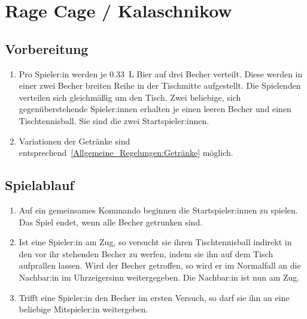\chapter{Rage Cage / Kalaschnikow}
\section{Vorbereitung}
\begin{enumerate}[label={(\arabic*)}]
    \item
    Pro Spieler:in werden je \SI{0,33}{\liter} Bier auf drei Becher verteilt.
    Diese werden in einer zwei Becher breiten Reihe in der Tischmitte aufgestellt.
    Die Spielenden verteilen sich gleichmäßig um den Tisch.
    Zwei beliebige, sich gegenüberstehende Spieler:innen erhalten je einen leeren Becher und einen Tischtennisball.
    Sie sind die zwei Startspieler:innen.

    \item
    Variationen der Getränke sind entsprechend~\ref{Allgemeine_Regelungen:Getränke} möglich.
\end{enumerate}

\section{Spielablauf}
\begin{enumerate}[label={(\arabic*)}]
    \item
    Auf ein gemeinsames Kommando beginnen die Startspieler:innen zu spielen.
    Das Spiel endet, wenn alle Becher getrunken sind.

    \item
    Ist eine Spieler:in am Zug, so versucht sie ihren Tischtennisball indirekt in den vor ihr stehenden Becher zu werfen, indem sie ihn auf dem Tisch aufprallen lassen.
    Wird der Becher getroffen, so wird er im Normalfall an die Nachbar:in im Uhrzeigersinn weitergegeben.
    Die Nachbar:in ist nun am Zug.

    \item
    Trifft eine Spieler:in den Becher im ersten Versuch, so darf sie ihn an eine beliebige Mitspieler:in weitergeben.
\end{enumerate}

